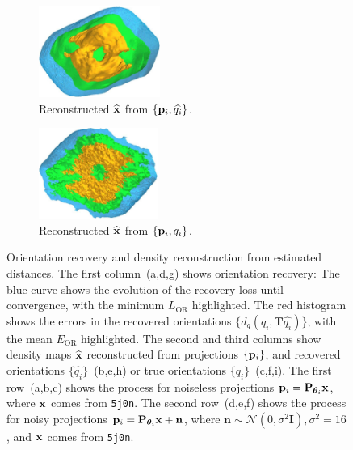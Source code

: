 \begin{figure}[t]
\begin{subfigure}[b]{0.26\linewidth}
        \centering
        \includegraphics[height=8em]{figures/5a1a_aligned}
        \caption{Reconstructed $\widehat{\mathbf{x}}$ from $\{ \mathbf{p}_i, \widehat{q_i} \}$.}%
        \label{fig:5a1a-noise0-reconstruction-recovered}
    \end{subfigure}
    \hfill
    \begin{subfigure}[b]{0.26\linewidth}
        \centering
        \includegraphics[height=8em]{figures/5a1a_ground_truth}
        \caption{Reconstructed $\widehat{\mathbf{x}}$ from $\{ \mathbf{p}_i, q_i \}$.}%
        \label{fig:5a1a-noise0-reconstruction-true}
    \end{subfigure}
    \caption{%
        Orientation recovery and density reconstruction from estimated distances.
        The first column~(a,d,g) shows orientation recovery:
        The blue curve shows the evolution of the recovery loss until convergence, with the minimum $L_\text{OR}$  highlighted.
        The red histogram shows the errors in the recovered orientations $\{d_q(q_i, \mathbf{T}\widehat{q_i})\}$, with the mean $E_\text{OR}$  highlighted.
    The second and third columns show density maps $\widehat{\mathbf{x}}$ reconstructed from projections $\{ \mathbf{p}_i \}$, and recovered orientations $\{ \widehat{q_i} \}$~(b,e,h) or true orientations $\{ q_i \}$~(c,f,i).
        The first row~(a,b,c) shows the process for noiseless projections $\mathbf{p}_i = \mathbf{P}_{{\boldsymbol{\theta}}_i} \mathbf{x}$, where $\mathbf{x}$ comes from \texttt{5j0n}.
        The second row~(d,e,f) shows the process for noisy projections $\mathbf{p}_i = \mathbf{P}_{{\boldsymbol{\theta}}_i} \mathbf{x} + \mathbf{n}$, where $\mathbf{n} \sim \mathcal{N}(0, \sigma^2\mathbf{I}), \sigma^2=16$, and $\mathbf{x}$ comes from \texttt{5j0n}.
}
\end{figure}
